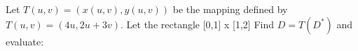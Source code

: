 Let $T(u, v) = (x(u, v), y(u, v))$ be the mapping defined by $T(u, v) = (4u, 2u+3v).$ Let the rectangle [0,1] x [1,2]
Find $D = T(D^*)$ and evaluate:
